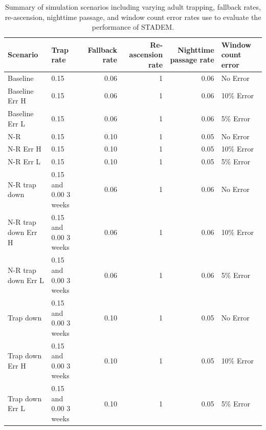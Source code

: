 \documentclass[
  12pt,
]{article}
\begin{document}
\begin{table}

\caption{\label{tab:lgr-sim-tab}Summary of simulation scenarios including varying adult trapping, fallback rates, re-ascension, nighttime passage, and window count error rates use to evaluate the performance of STADEM.}
\centering
\begin{tabular}[t]{llrrrl}
\toprule
Scenario & Trap rate & Fallback rate & Re-ascension rate & Nighttime passage rate & Window count error\\
\midrule
Baseline & 0.15 & 0.06 & 1 & 0.06 & No Error\\
Baseline Err H & 0.15 & 0.06 & 1 & 0.06 & 10\% Error\\
Baseline Err L & 0.15 & 0.06 & 1 & 0.06 & 5\% Error\\
N-R & 0.15 & 0.10 & 1 & 0.05 & No Error\\
N-R Err H & 0.15 & 0.10 & 1 & 0.05 & 10\% Error\\
\addlinespace
N-R Err L & 0.15 & 0.10 & 1 & 0.05 & 5\% Error\\
N-R trap down & 0.15 and 0.00 3 weeks & 0.06 & 1 & 0.06 & No Error\\
N-R trap down Err H & 0.15 and 0.00 3 weeks & 0.06 & 1 & 0.06 & 10\% Error\\
N-R trap down Err L & 0.15 and 0.00 3 weeks & 0.06 & 1 & 0.06 & 5\% Error\\
Trap down & 0.15 and 0.00 3 weeks & 0.10 & 1 & 0.05 & No Error\\
\addlinespace
Trap down Err H & 0.15 and 0.00 3 weeks & 0.10 & 1 & 0.05 & 10\% Error\\
Trap down Err L & 0.15 and 0.00 3 weeks & 0.10 & 1 & 0.05 & 5\% Error\\
\bottomrule
\end{tabular}
\end{table}
\end{document}
